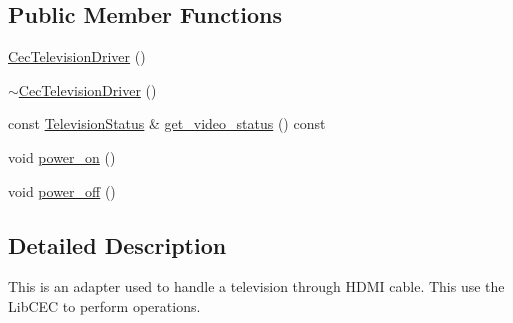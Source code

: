 \subsection*{Public Member Functions}
\begin{DoxyCompactItemize}
\item 
\hyperlink{classCecTelevisionDriver_a6fc32515ca7c7dc05e8256c1b5dc15ca}{Cec\+Television\+Driver} ()
\item 
\hyperlink{classCecTelevisionDriver_a5d21757c126ad25a5d45686ba76f487a}{$\sim$\+Cec\+Television\+Driver} ()
\item 
const \hyperlink{structTelevisionStatus}{Television\+Status} \& \hyperlink{classCecTelevisionDriver_a7951a3e9f71c699b880af51a12a1764d}{get\+\_\+video\+\_\+status} () const 
\item 
void \hyperlink{classCecTelevisionDriver_a57d6f70f16b35e54e6ce3423c96f0c18}{power\+\_\+on} ()
\item 
void \hyperlink{classCecTelevisionDriver_a5ef7d248edd310444f670499ccf8f765}{power\+\_\+off} ()
\end{DoxyCompactItemize}


\subsection{Detailed Description}
This is an adapter used to handle a television through H\+D\+M\+I cable. This use the Lib\+C\+E\+C to perform operations. 

